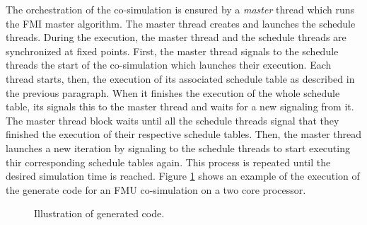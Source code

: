 The orchestration of the co-simulation is ensured by a \textit{master} thread which runs the FMI master algorithm. The master thread creates and launches the schedule threads. During the execution, the master thread and the schedule threads are synchronized at fixed points. First, the master thread signals to the schedule threads the start of the co-simulation which launches their execution. Each thread starts, then, the execution of its associated schedule table as described in the previous paragraph. When it finishes the execution of the whole schedule table, its signals this to the master thread and waits for a new signaling from it. The master thread block waits until all the schedule threads signal that they finished the execution of their respective schedule tables. Then, the master thread launches a new iteration by signaling to the schedule threads to start executing thir corresponding schedule tables again. This process is repeated until the desired simulation time is reached. Figure \ref{fig:codegen} shows an example of the execution of the generate code for an FMU co-simulation on a two core processor.

\begin{figure}[phbt]
\centering

\caption{Illustration of generated code.}
\label{fig:codegen}
\end{figure}   


